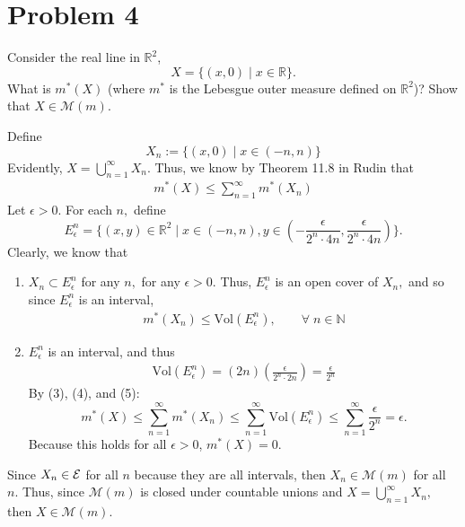 \documentclass[11pt]{article}
\newcommand{\Vol}{\text{Vol}}
\newcommand{\bbN}{\mathbb{N}}
\newcommand{\bbR}{\mathbb{R}}
\begin{document}
\section*{Problem 4}
\begin{problem}
    Consider the real line in $\mathbb{R}^2$, 
\[
X = \{(x,0) \mid x \in \mathbb{R}\}.
\]
What is $m^*(X)$ (where $m^*$ is the Lebesgue outer measure defined on $\mathbb{R}^2$)? Show that $X \in \mathcal{M}(m)$.
\end{problem}
\begin{solution}
Define 
\[X_n := \{(x,0) \mid x \in (-n, n)\}\]
Evidently, $X = \bigcup_{n=1}^\infty X_n.$ Thus, we know by Theorem 11.8 in Rudin that
\begin{align}
m^*(X) \leq \sum_{n=1}^\infty m^*(X_n)    
\end{align}
Let $\epsilon>0.$ For each $n,$ define 
\[E_\epsilon^n = \{(x,y) \in \bbR^2 \mid x \in (-n, n), y \in (-\frac{\epsilon}{2^n \cdot 4n}, \frac{\epsilon}{2^n \cdot 4n})\}.\] Clearly, we know that 
\begin{enumerate}
    \item $X_n \subset E_\epsilon^n$ for any $n,$ for any $\epsilon>0.$ Thus, $E_\epsilon^n$ is an open cover of $X_n,$ and so since $E_\epsilon^n$ is an interval,
    \begin{align}
        m^*(X_n) \leq \Vol(E_\epsilon^n), \qquad \forall \;n \in \bbN
    \end{align}
    \item $E_\epsilon^n$ is an interval, and thus 
    \begin{align}\Vol(E_\epsilon^n) = (2n)(\frac{\epsilon}{2^n \cdot 2n}) = \frac{\epsilon}{2^n}    
    \end{align}
By (3), (4), and (5):
\[m^*(X) \leq \sum_{n=1}^\infty m^*(X_n)\leq \sum_{n=1}^\infty \Vol(E_\epsilon^n) \leq \sum_{n=1}^\infty \frac{\epsilon}{2^n} = \epsilon.\] Because this holds for all $\epsilon>0$, $m^*(X) = 0.$ 

\end{enumerate}
Since $X_n \in \cal E$ for all $n$ because they are all intervals, then $X_n \in \mathcal{M}(m)$ for all $n.$ Thus, since $\mathcal{M}(m)$ is closed under countable unions and $X = \bigcup_{n=1}^\infty X_n,$ then $X \in \mathcal{M}(m).$
\end{solution}

\newpage
\end{document}
